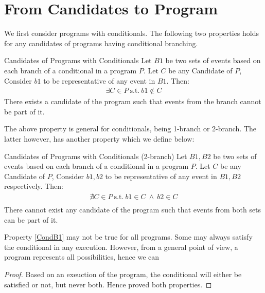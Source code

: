 \section{From Candidates to Program}

    We first consider programs with conditionals. The following two properties holds for any candidates of programs having conditional branching. 

    \begin{property}{Candidates of Programs with Conditionals}
        \label{CondB1}
        Let $B1$ be two sets of events based on each branch of a conditional in a program $P$. Let $C$ be any Candidate of $P$, Consider $b1$ to be representative of any event in $B1$. Then:
        \begin{align*}
            \exists C \in P \ \text{s.t.} \ b1 \notin C  
        \end{align*}
        There exists a candidate of the program such that events from the branch cannot be part of it. 
    \end{property}

    The above property is general for conditionals, being 1-branch or 2-branch. The latter however, has another property which we define below:

    \begin{property}{Candidates of Programs with Conditionals (2-branch)}
        \label{CondB2}
        Let $B1,B2$ be two sets of events based on each branch of a conditional in a program $P$. Let $C$ be any Candidate of $P$, Consider $b1,b2$ to be representative of any event in $B1,B2$ respectively. Then:
        \begin{align*}
            \nexists C \in P \ \text{s.t.} \ b1 \in C \ \wedge \ b2 \in C \\ 
        \end{align*}
        There cannot exist any candidate of the program such that events from both sets can be part of it. 
    \end{property}

    Property \ref{CondB1} may not be true for all programs. Some may always satisfy the conditional in any execution. However, from a general point of view, a program represents all possibilities, hence we can 


    \begin{proof}
        Based on an exeuction of the program, the conditional will either be satisfied or not, but never both. Hence proved both properties. 
    \end{proof}


